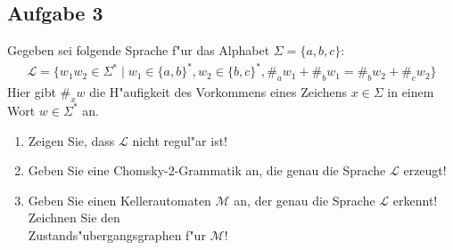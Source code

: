 \documentclass[10pt,oneside,onecolumn,a4paper,german,titlepage]{article}
\begin{document}
\subsection*{Aufgabe 3}
Gegeben sei folgende Sprache f"ur das Alphabet $\Sigma = \{a,b,c\}$:
\begin{eqnarray*}
\mathcal{L} = \{w_1w_2 \in \Sigma^* \; | \; w_1 \in \{a,b\}^*,w_2 \in \{b,c\}^*,
\#_a w_1 + \#_b w_1 = \#_b w_2 + \#_c w_2\}
\end{eqnarray*}
Hier gibt $\#_x w$ die H"aufigkeit des Vorkommens eines Zeichens $x \in \Sigma$ in
einem Wort $w \in \Sigma^*$ an.
\begin{enumerate}
\item Zeigen Sie, dass $\mathcal{L}$ nicht regul"ar ist!
\item Geben Sie eine Chomsky-2-Grammatik an, die genau die Sprache $\mathcal{L}$
erzeugt!
\item Geben Sie einen Kellerautomaten $\mathcal{M}$ an, der genau die Sprache
$\mathcal{L}$ erkennt! Zeichnen Sie den\\
Zustands"ubergangsgraphen f"ur $\mathcal{M}$!
\end{enumerate}

\newpage
\end{document}
